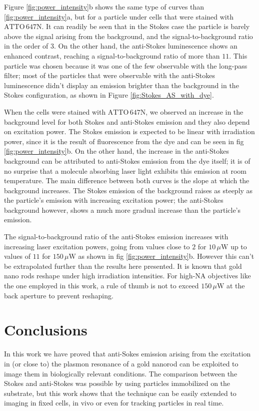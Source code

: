 \documentclass[journal=nalefd,manuscript=letter]{achemso}
\newcommand{\uW}{\ensuremath{\,\mu\textrm{W}}}
\newcommand{\atto}{\ensuremath{\textrm{ATTO}\,647\textrm{N}}}
\begin{document}
Figure \ref{fig:power_intensity}b shows the same type of curves than
\ref{fig:power_intensity}a, but for a particle under cells that were stained
with \atto. It can readily be seen that in the Stokes case the particle is
barely above the signal arising from the background, and the
signal-to-background ratio in the order of $3$. On the other hand, the
anti-Stokes luminescence shows an enhanced contrast, reaching a
signal-to-background ratio of more than $11$. This particle was chosen because
it was one of the few observable with the long-pass filter; most of the
particles that were observable with the anti-Stokes luminescence didn't display
an emission brighter than the background in the Stokes configuration, as shown
in Figure \ref{fig:Stokes_AS_with_dye}.

When the cells were stained with \atto, we observed an increase in the
background level for both Stokes and anti-Stokes emission and they also depend
on excitation power. The Stokes emission is expected to be linear with
irradiation power, since it is the result of fluorescence from the dye and can
be seen in fig \ref{fig:power_intensity}b. On the other hand, the increase in
the anti-Stokes background can be attributed to anti-Stokes emission from the
dye itself; it is of no surprise that a molecule absorbing laser light exhibits
this emission at room temperature. The main difference between both curves is
the slope at which the background increases. The Stokes emission of the
background raises as steeply as the particle's emission with increasing
excitation power; the anti-Stokes background however, shows a much more gradual
increase than the particle's emission.

The signal-to-background ratio of the anti-Stokes emission increases with
increasing laser excitation powers, going from values close to $2$ for $10\uW$
up to values of $11$ for $150\uW$ as shown in fig \ref{fig:power_intensity}b.
However this can't be extrapolated further than the results here presented. It
is known that gold nano rods reshape under high irradiation intensities. For
high-NA objectives like the one employed in this work, a rule of thumb is not to
exceed $150\uW$ at the back aperture to prevent reshaping.

\section{Conclusions}
In this work we have proved that anti-Sokes emission arising from the excitation
in (or close to) the plasmon resonance of a gold nanorod can be exploited to
image them in biologically relevant conditions. The comparison between the
Stokes and anti-Stokes was possible by using particles immobilized on the
substrate, but this work shows that the technique can be easily extended to
imaging in fixed cells, in vivo or even for tracking particles in real time.
\end{document}
